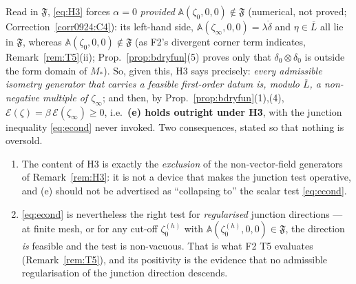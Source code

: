 \documentclass[11pt]{article}
\newcommand{\Aop}{\mathbb A}
\begin{document}
\begin{remark}\label{rem:H3space}
Read in $\mathfrak F$, \eqref{eq:H3} forces $\alpha=0$ \emph{provided} $\Aop(\zeta_0,0,0)\notin\mathfrak F$ (numerical, not proved; Correction~\ref{corr0924:C4}): its left-hand side,
$\Aop(\zeta_\infty,0,0)=\lambda\dot\delta$ and $\eta\in\overline L$ all lie in
$\mathfrak F$, whereas $\Aop(\zeta_0,0,0)\notin\mathfrak F$
(as F2's divergent corner term indicates, Remark~\ref{rem:T5}(ii); Prop.~\ref{prop:bdryfun}(5) proves only that $\delta_0\otimes\delta_0$ is outside the form domain of $M_*$).  So, given this, H3 says precisely:
\emph{every admissible isometry generator that carries a feasible first-order datum is, modulo
$\overline L$, a non-negative multiple of $\zeta_\infty$}; and then, by
Prop.~\ref{prop:bdryfun}(1),(4), $\mathcal E(\zeta)=\beta\,\mathcal E(\zeta_\infty)\ge0$, i.e.\
\textbf{(e) holds outright under H3}, with the junction inequality \eqref{eq:econd} never
invoked.  Two consequences, stated so that nothing is oversold.
\begin{enumerate}[leftmargin=1.6em,itemsep=1pt]
\item The content of H3 is exactly the \emph{exclusion} of the non-vector-field generators
 of Remark~\ref{rem:H3}: it is not a device that makes the junction test operative, and (e)
 should not be advertised as ``collapsing to'' the scalar test \eqref{eq:econd}.
\item \eqref{eq:econd} is nevertheless the right test for \emph{regularised} junction
 directions --- at finite mesh, or for any cut-off $\zeta_0^{(h)}$ with
 $\Aop(\zeta_0^{(h)},0,0)\in\mathfrak F$, the direction \emph{is} feasible and the test is
 non-vacuous.  That is what F2 T5 evaluates (Remark~\ref{rem:T5}), and its positivity is
 the evidence that no admissible regularisation of the junction direction descends.
\end{enumerate}
\end{remark}
\end{document}
